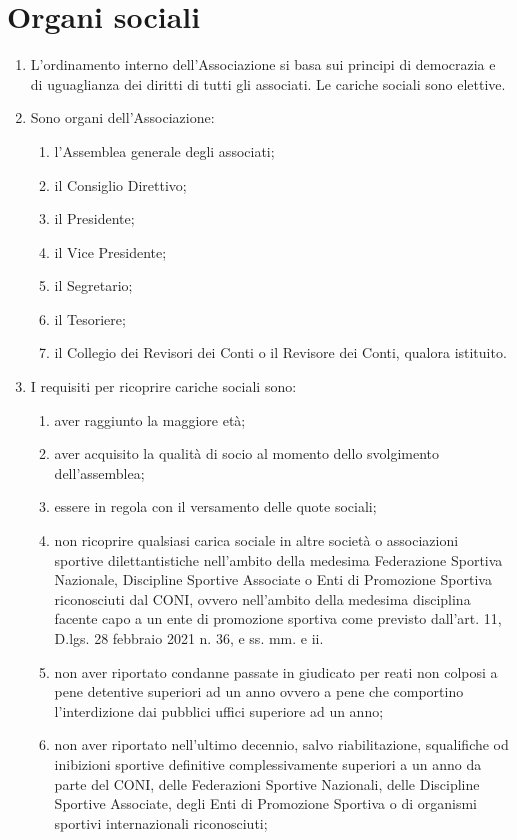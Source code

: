 \documentclass{djtsasddoc}
\begin{document}
	\section{Organi sociali}
	\begin{enumerate}
		\item L'ordinamento interno dell'Associazione si basa sui principi di democrazia e di uguaglianza dei diritti di tutti gli associati. Le cariche sociali sono elettive.
		\item Sono organi dell'Associazione:
		\begin{enumerate}
			\item l'Assemblea generale degli associati;
			\item il Consiglio Direttivo;
			\item il Presidente;
			\item il Vice Presidente;
			\item il Segretario;
			\item il Tesoriere;
			\item il Collegio dei Revisori dei Conti o il Revisore dei Conti, qualora istituito.
		\end{enumerate}
		\item I requisiti per ricoprire cariche sociali sono:
		\begin{enumerate}
			\item aver raggiunto la maggiore età;
			\item aver acquisito la qualità di socio al momento dello svolgimento dell'assemblea;
			\item essere in regola con il versamento delle quote sociali;
			\item non ricoprire qualsiasi carica sociale in altre società o associazioni sportive dilettantistiche nell'ambito della medesima Federazione Sportiva Nazionale, Discipline Sportive Associate o Enti di Promozione Sportiva riconosciuti dal CONI, ovvero nell'ambito della medesima disciplina facente capo a un ente di promozione sportiva come previsto dall'art. 11, D.lgs. 28 febbraio 2021 n. 36, e ss. mm. e ii.
			\item non aver riportato condanne passate in giudicato per reati non colposi a pene detentive superiori ad un anno ovvero a pene che comportino l'interdizione dai pubblici uffici superiore ad un anno;
			\item non aver riportato nell'ultimo decennio, salvo riabilitazione, squalifiche od inibizioni sportive definitive complessivamente superiori a un anno da parte del CONI, delle Federazioni Sportive Nazionali, delle Discipline Sportive Associate, degli Enti di Promozione Sportiva o di organismi sportivi internazionali riconosciuti;

\end{enumerate}
\end{enumerate}
\end{document}
